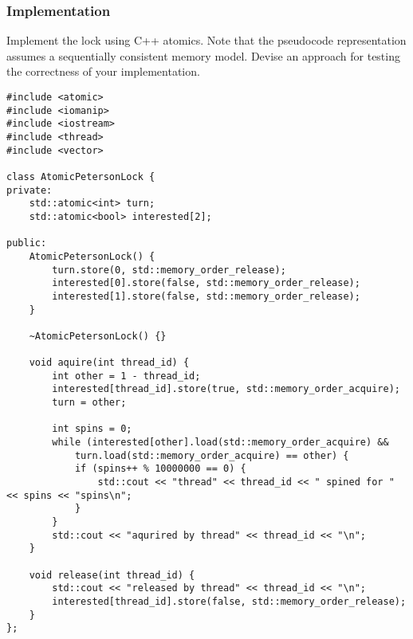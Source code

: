 \documentclass[11pt]{article}
\begin{document}
\subsubsection{Implementation}
\label{sec:orgff981ee}
Implement the lock using C++ atomics. Note that the pseudocode
representation assumes a sequentially consistent memory
model. Devise an approach for testing the correctness of your
implementation. 
\begin{verbatim}
#include <atomic>
#include <iomanip>
#include <iostream>
#include <thread>
#include <vector>

class AtomicPetersonLock {
private:
    std::atomic<int> turn;
    std::atomic<bool> interested[2];

public:
    AtomicPetersonLock() {
        turn.store(0, std::memory_order_release);
        interested[0].store(false, std::memory_order_release);
        interested[1].store(false, std::memory_order_release);
    }

    ~AtomicPetersonLock() {}

    void aquire(int thread_id) {
        int other = 1 - thread_id;
        interested[thread_id].store(true, std::memory_order_acquire);
        turn = other;

        int spins = 0;
        while (interested[other].load(std::memory_order_acquire) &&
            turn.load(std::memory_order_acquire) == other) {
            if (spins++ % 10000000 == 0) {
                std::cout << "thread" << thread_id << " spined for " << spins << "spins\n";
            }
        }
        std::cout << "aqurired by thread" << thread_id << "\n";
    }

    void release(int thread_id) {
        std::cout << "released by thread" << thread_id << "\n";
        interested[thread_id].store(false, std::memory_order_release);
    }
};
\end{verbatim}
\newpage
\end{document}
